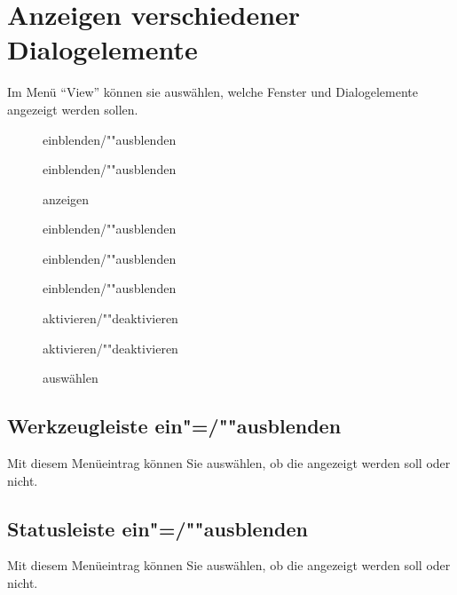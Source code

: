 \section{Anzeigen verschiedener Dialogelemente}\label{sec:MS_VIEW}
Im Menü "`View"' können sie auswählen, welche Fenster und 
Dialogelemente angezeigt werden sollen.

\begin{description}
\item[]
   einblenden/""ausblenden
\item[]
   einblenden/""ausblenden
\item[]
   anzeigen
\item[]
   einblenden/""ausblenden
\item[]
   einblenden/""ausblenden
\item[]
   einblenden/""ausblenden
\item[]
   aktivieren/""deaktivieren
\item[]
  aktivieren/""deaktivieren
\item[]
   auswählen
\end{description}

\subsection{Werkzeugleiste ein"=/""ausblenden}
\label{sec:MI_TOOLBAR}

Mit diesem Menüeintrag können Sie auswählen, ob die
 angezeigt werden soll oder
nicht.


\subsection{Statusleiste ein"=/""ausblenden}
\label{sec:MI_STATUS}

Mit diesem Menüeintrag können Sie auswählen, ob die  
angezeigt werden soll oder nicht.



